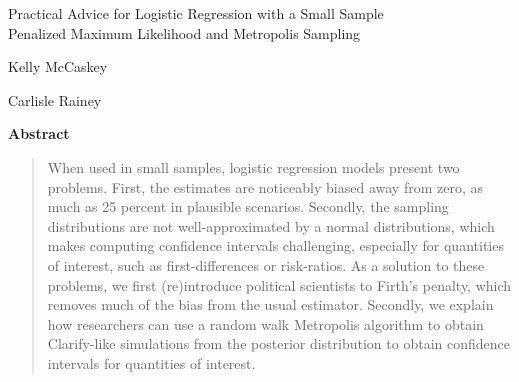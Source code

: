 \documentclass[12pt]{article}
\begin{document}
\begin{center}
{\Large Practical Advice for Logistic Regression with a Small Sample}\\\vspace{2mm}
{\large Penalized Maximum Likelihood and Metropolis Sampling}\\\vspace{2mm}


\vspace{10mm}

Kelly McCaskey

\vspace{3mm}

Carlisle Rainey
\end{center}

\vspace{10mm}

{\centerline{\textbf{Abstract}}}
\begin{quote}\noindent
When used in small samples, logistic regression models present two problems. First, the estimates are noticeably biased away from zero, as much as 25 percent in plausible scenarios. Secondly, the sampling distributions are not well-approximated by a normal distributions, which makes computing confidence intervals challenging, especially for quantities of interest, such as first-differences or risk-ratios. As a solution to these problems, we first (re)introduce political scientists to Firth's penalty, which removes much of the bias from the usual estimator. Secondly, we explain how researchers can use a random walk Metropolis algorithm to obtain Clarify-like simulations from the posterior distribution to obtain confidence intervals for quantities of interest.
 \end{quote}


\thispagestyle{empty}

\newpage
\doublespace
\end{document}
